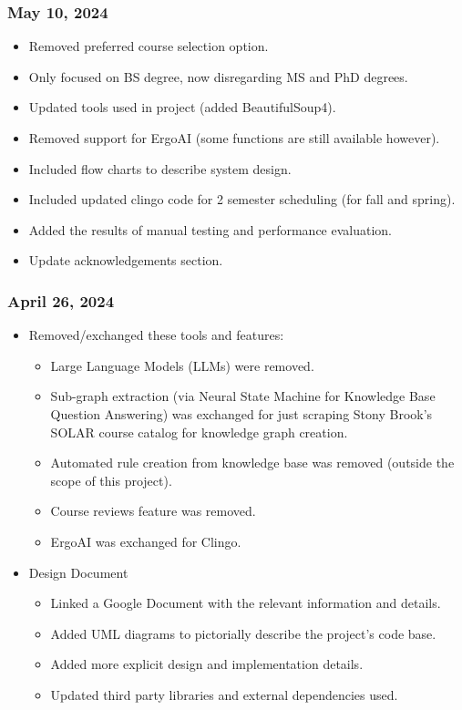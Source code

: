 \documentclass[12pt]{article}
\begin{document}
    \subsubsection*{May 10, 2024}

    \begin{itemize}
        \item Removed preferred course selection option.
        \item Only focused on BS degree, now disregarding MS and PhD degrees.
        \item Updated tools used in project (added BeautifulSoup4).
        \item Removed support for ErgoAI (some functions are still available however).
        \item Included flow charts to describe system design.
        \item Included updated clingo code for 2 semester scheduling (for fall and spring).
        \item Added the results of manual testing and performance evaluation.
        \item Update acknowledgements section.
    \end{itemize}

    
    \subsubsection*{April 26, 2024}

    \begin{itemize}
        \item Removed/exchanged these tools and features:
        \begin{itemize}
            \item Large Language Models (LLMs) were removed.
            \item Sub-graph extraction (via Neural State Machine for Knowledge Base Question Answering) was exchanged for just scraping Stony Brook's SOLAR course catalog for knowledge graph creation.
            \item Automated rule creation from knowledge base was removed (outside the scope of this project).
            \item Course reviews feature was removed.
            \item ErgoAI was exchanged for Clingo.
        \end{itemize}
        \item Design Document
        \begin{itemize}
            \item Linked a Google Document with the relevant information and details.
            \item Added UML diagrams to pictorially describe the project's code base.
            \item Added more explicit design and implementation details.
            \item Updated third party libraries and external dependencies used.
        \end{itemize}
    \end{itemize}
\end{document}
